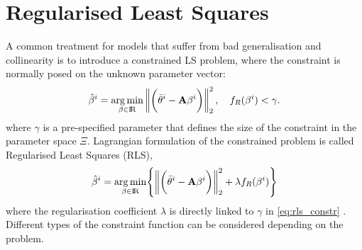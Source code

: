 \documentclass[a4paper,11pt,twoside]{article}
\newcommand{\norm}[1]{\left\lVert#1\right\rVert}
\DeclareMathOperator{\R}{\rm I\!R}
\theoremstyle{mytheoremstyle}
\begin{document}
\section{Regularised Least Squares}
\par A common treatment for models that suffer from bad generalisation and collinearity is to introduce a constrained LS problem, where the constraint is normally posed on the unknown parameter vector:
\begin{equation}\label{eq:rls_constr}
\hat{\mathbf{\beta}}^i = \underset{\beta \in \R}{\arg \min}\norm{ \biggl(\bar{\theta}^i - \mathbf{A} \mathbf{\beta}^i \biggr) }^{2}_{2}, \quad f_{R}(\mathbf{\beta}^i) < \gamma.
\end{equation}
where $\gamma$ is a pre-specified parameter that defines the size of the constraint in the parameter space $\Xi$.
Lagrangian formulation of the constrained problem is called Regularised Least Squares (RLS),
\begin{equation}\label{eq:rls_problem}
\hat{\mathbf{\beta}}^i = \underset{\beta \in \R}{\arg \min} \Biggl\{\norm{ \biggl(\bar{\theta}^i - \mathbf{A} \mathbf{\beta}^i \biggr) }^{2}_{2} + \lambda f_{R}(\mathbf{\beta}^i)\Biggr\}
\end{equation}
where the regularisation coefficient $\lambda$ is directly linked to  $\gamma$ in \eqref{eq:rls_constr} \cite{Seber2003}. Different types of the constraint function can be considered depending on the problem.
\end{document}
